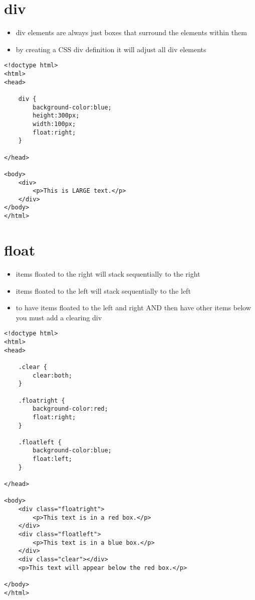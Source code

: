 \documentclass{article}
\begin{document}
\section{div}
\begin{itemize}
  \item div elements are always just boxes that surround the elements within
    them
  \item by creating a CSS div definition it will adjust all div elements
\end{itemize}
\begin{lstlisting}
<!doctype html>
<html>
<head>

    div {
        background-color:blue;
        height:300px;
        width:100px;
        float:right;
    }

</head>

<body>
    <div>
        <p>This is LARGE text.</p>
    </div>
</body>
</html>
\end{lstlisting}

\section{float}
\begin{itemize}
  \item items floated to the right will stack sequentially to the right
  \item items floated to the left will stack sequentially to the left
  \item to have items floated to the left and right AND then have other items
    below you must add a clearing div
\end{itemize}
\begin{lstlisting}
<!doctype html>
<html>
<head>

    .clear {
        clear:both;
    }

    .floatright {
        background-color:red;
        float:right;
    }

    .floatleft {
        background-color:blue;
        float:left;
    }

</head>

<body>
    <div class="floatright">
        <p>This text is in a red box.</p>
    </div>
    <div class="floatleft">
        <p>This text is in a blue box.</p>
    </div>
    <div class="clear"></div>
    <p>This text will appear below the red box.</p>

</body>
</html>
\end{lstlisting}
\end{document}
